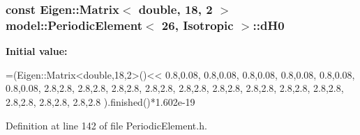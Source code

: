 \subsubsection[{d\+H0}]{\setlength{\rightskip}{0pt plus 5cm}const Eigen\+::\+Matrix$<$ double, 18, 2 $>$ {\bf model\+::\+Periodic\+Element}$<$ 26, {\bf Isotropic} $>$\+::d\+H0\hspace{0.3cm}{\ttfamily [static]}}\label{structmodel_1_1_periodic_element_3_0126_00_01_isotropic_01_4_a56ae5b1281c97a91195b7656342f31d9}
{\bfseries Initial value\+:}
\begin{DoxyCode}
=(Eigen::Matrix<double,18,2>()<<
                                                                        0.8,0.08, 
                                                                        0.8,0.08, 
                                                                        0.8,0.08, 
                                                                        0.8,0.08, 
                                                                        0.8,0.08, 
                                                                        0.8,0.08, 
                                                                        2.8,2.8, 
                                                                        2.8,2.8, 
                                                                         2.8,2.8, 
                                                                         2.8,2.8, 
                                                                         2.8,2.8, 
                                                                         2.8,2.8, 
                                                                         2.8,2.8, 
                                                                         2.8,2.8, 
                                                                         2.8,2.8, 
                                                                         2.8,2.8, 
                                                                         2.8,2.8, 
                                                                         2.8,2.8 
                                                                        ).finished()*1.602e-19
\end{DoxyCode}


Definition at line 142 of file Periodic\+Element.\+h.

\hypertarget{structmodel_1_1_periodic_element_3_0126_00_01_isotropic_01_4_aedee16b5777c60b48c584b6a1795c17b}{}
